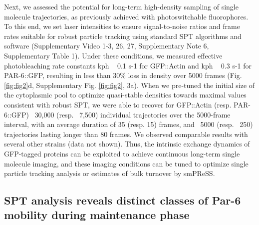  
 Next, we assessed the potential for long-term high-density sampling of single molecule trajectories, as previously achieved with photoswitchable fluorophores. To this end, we set laser intensities to ensure signal-to-noise ratios and frame rates suitable for robust particle tracking using standard SPT algorithms and software (Supplementary Video 1-3, 26, 27, Supplementary Note 6, Supplementary Table 1). Under these conditions, we measured effective photobleaching rate constants kph ~ 0.1 s-1 for GFP::Actin and kph ~ 0.3 s-1 for PAR-6::GFP, resulting in less than 30\% loss in density over 5000 frames (Fig. \ref{fig:fig2}d, Supplementary Fig. \ref{fig:fig2}, 3a). When we pre-tuned the initial size of the cytoplasmic pool to optimize quasi-stable densities towards maximal values consistent with robust SPT, we were able to recover for GFP::Actin (resp. PAR-6::GFP) ~30,000 (resp. ~7,500) individual trajectories over the 5000-frame interval, with an average duration of 35 (resp. 15) frames, and ~5000 (resp. ~250) trajectories lasting longer than 80 frames. We observed comparable results with several other strains (data not shown). Thus, the intrinsic exchange dynamics of GFP-tagged proteins can be exploited to achieve continuous long-term single molecule imaging, and these imaging conditions can be tuned to optimize single particle tracking analysis or estimates of bulk turnover by smPReSS.
 
 
 \subsection{SPT analysis reveals distinct classes of Par-6 mobility during maintenance phase}
 
